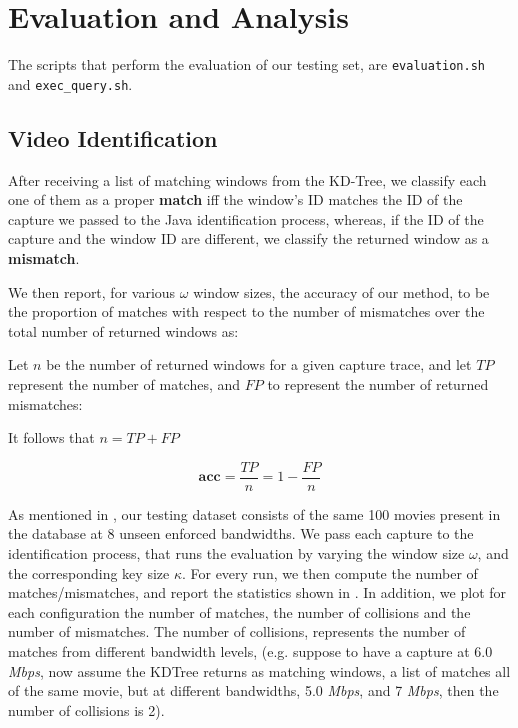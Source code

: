 \chapter{Evaluation and Analysis}\label{sec:results}

The scripts that perform the evaluation of our testing set, are
\texttt{evaluation.sh} and \texttt{exec\_query.sh}.

\section{Video Identification} After receiving a list of matching windows from
the KD-Tree, we classify each one of them as a proper \textbf{match} iff the
window's ID matches the ID of the capture we passed to the Java identification
process, whereas, if the ID of the capture and the window ID are different, we
classify the returned window as a \textbf{mismatch}.

We then report, for various $\omega$ window sizes, the accuracy of our method,
to be the proportion of matches with respect to the number of mismatches over
the total number of returned windows as:

Let $n$ be the number of returned windows for a given capture trace, and let
$TP$ represent the number of matches, and $FP$ to represent the number of
returned mismatches:

It follows that $n = TP + FP$

\begin{equation*}
    \mathbf{acc} = \dfrac{TP}{n} = 1 - \dfrac{FP}{n}
\end{equation*}

As mentioned in , our testing dataset consists of the same
100 movies present in the database at 8 unseen enforced bandwidths. We pass
each capture to the identification process, that runs the evaluation by varying
the window size $\omega$, and the corresponding key size $\kappa$. For every
run, we then compute the number of matches/mismatches, and report the
statistics shown in . In addition, we plot for each
configuration the number of matches, the number of collisions and the number of
mismatches. The number of collisions, represents the number of matches from
different bandwidth levels, (e.g. suppose to have a capture at 6.0 \emph{Mbps},
now assume the KDTree returns as matching windows, a list of matches all of the
same movie, but at different bandwidths, 5.0 \emph{Mbps}, and 7 \emph{Mbps},
then the number of collisions is 2).

